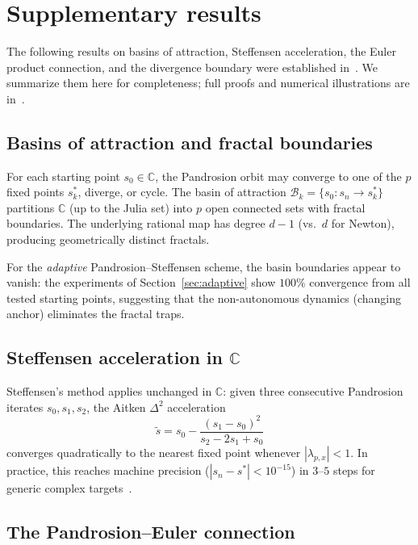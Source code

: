 \documentclass[10pt,a4paper,oneside]{book}
\theoremstyle{definition}
\theoremstyle{remark}
\newcommand{\CC}{\mathbb{C}}
\begin{document}
\section{Supplementary results}
\label{sec:supplementary}

The following results on basins of attraction, Steffensen acceleration, the Euler product connection, and the divergence boundary were established in~\cite{besevic2026complex}.  We summarize them here for completeness; full proofs and numerical illustrations are in~\cite{besevic2026complex}.

\subsection{Basins of attraction and fractal boundaries}
\label{sec:basins}

For each starting point $s_0 \in \CC$, the Pandrosion orbit may converge to one of the $p$ fixed points $s_k^*$, diverge, or cycle.  The basin of attraction $\mathcal{B}_k = \{s_0 : s_n \to s_k^*\}$ partitions $\CC$ (up to the Julia set) into $p$ open connected sets with fractal boundaries.  The underlying rational map has degree $d-1$ (vs.\ $d$ for Newton), producing geometrically distinct fractals.

For the \emph{adaptive} Pandrosion--Steffensen scheme, the basin boundaries appear to vanish: the experiments of Section~\ref{sec:adaptive} show $100\%$ convergence from all tested starting points, suggesting that the non-autonomous dynamics (changing anchor) eliminates the fractal traps.

\subsection{Steffensen acceleration in $\CC$}
\label{sec:steffensen_complex}

Steffensen's method applies unchanged in $\CC$: given three consecutive Pandrosion iterates $s_0, s_1, s_2$, the Aitken $\Delta^2$ acceleration
\[
  \tilde{s} = s_0 - \frac{(s_1 - s_0)^2}{s_2 - 2s_1 + s_0}
\]
converges quadratically to the nearest fixed point whenever $|\lambda_{p,x}| < 1$.  In practice, this reaches machine precision ($|s_n - s^*| < 10^{-15}$) in $3$--$5$ steps for generic complex targets~\cite[Table~4]{besevic2026complex}.

\subsection{The Pandrosion--Euler connection}
\label{sec:euler}
\end{document}
